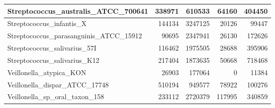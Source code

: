 \documentclass[12pt,a4paper]{article}
\begin{document}
\begin{table}[ht]
\begin{center}
\begin{tabular}{|l*{4}{|r}|}
Streptococcus\_australis\_ATCC\_700641 & 338971 & 610533 & 64160 & 404450 \\ \hline
Streptococcus\_infantis\_X & 144134 & 3247125 & 20126 & 99447 \\ \hline
Streptococcus\_parasanguinis\_ATCC\_15912 & 90695 & 2347941 & 26130 & 172626 \\ \hline
Streptococcus\_salivarius\_57I & 116462 & 1975505 & 28688 & 395906 \\ \hline
Streptococcus\_salivarius\_K12 & 217404 & 1873635 & 50668 & 718468 \\ \hline
Veillonella\_atypica\_KON & 26903 & 177064 & 0 & 11384 \\ \hline
Veillonella\_dispar\_ATCC\_17748 & 510194 & 949577 & 78922 & 100276 \\ \hline
Veillonella\_sp\_oral\_taxon\_158 & 233112 & 2720379 & 117995 & 340859 \\ \hline
\end{tabular}
\end{center}
\end{table}
\end{document}
